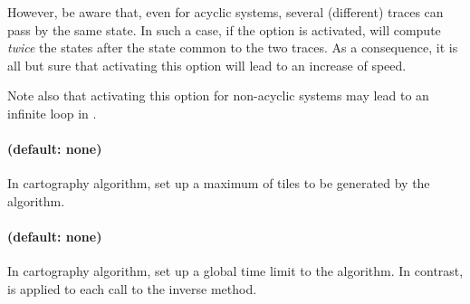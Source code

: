However, be aware that, even for acyclic systems, several (different) traces can pass by the same state.
In such a case, if the  option is activated, \imitator{} will compute \emph{twice} the states after the state common to the two traces.
As a consequence, it is all but sure that activating this option will lead to an increase of speed.

Note also that activating this option for non-acyclic systems may lead to an infinite loop in \imitator{}.


\paragraph{ (default: none)}

In cartography algorithm, set up a maximum of tiles to be generated by the algorithm.


\paragraph{ (default: none)}

In cartography algorithm, set up a global time limit to the algorithm.
In contrast,  is applied to each call to the inverse method.


%
%
%
%
%


